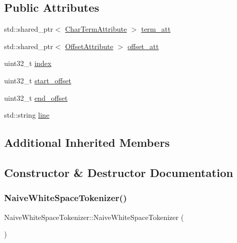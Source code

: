 \subsection*{Public Attributes}
\begin{DoxyCompactItemize}
\item 
std\+::shared\+\_\+ptr$<$ \mbox{\hyperlink{classlucene_1_1core_1_1analysis_1_1tokenattributes_1_1CharTermAttribute}{Char\+Term\+Attribute}} $>$ \mbox{\hyperlink{classNaiveWhiteSpaceTokenizer_ad2b2c7263641059662c19db8a3da72a9}{term\+\_\+att}}
\item 
std\+::shared\+\_\+ptr$<$ \mbox{\hyperlink{classlucene_1_1core_1_1analysis_1_1tokenattributes_1_1OffsetAttribute}{Offset\+Attribute}} $>$ \mbox{\hyperlink{classNaiveWhiteSpaceTokenizer_a45e026472fc925608372e2881d1db2f2}{offset\+\_\+att}}
\item 
uint32\+\_\+t \mbox{\hyperlink{classNaiveWhiteSpaceTokenizer_aa655cc24b8bb85dfedbbb0b42a50db92}{index}}
\item 
uint32\+\_\+t \mbox{\hyperlink{classNaiveWhiteSpaceTokenizer_a94597a26813f5ac60aa3825bf57c20d8}{start\+\_\+offset}}
\item 
uint32\+\_\+t \mbox{\hyperlink{classNaiveWhiteSpaceTokenizer_ae68186bbc8f2a7f32d5c3c2f90014d7f}{end\+\_\+offset}}
\item 
std\+::string \mbox{\hyperlink{classNaiveWhiteSpaceTokenizer_a4d32b68e050394299ec7bfc6eddf7fd5}{line}}
\end{DoxyCompactItemize}
\subsection*{Additional Inherited Members}


\subsection{Constructor \& Destructor Documentation}
\mbox{\label{classNaiveWhiteSpaceTokenizer_a4364bb2206efa47c4ea1cb9eb421d3ec}} 
\subsubsection{\texorpdfstring{Naive\+White\+Space\+Tokenizer()}{NaiveWhiteSpaceTokenizer()}}
{\footnotesize\ttfamily Naive\+White\+Space\+Tokenizer\+::\+Naive\+White\+Space\+Tokenizer (\begin{DoxyParamCaption}{ }\end{DoxyParamCaption})\hspace{0.3cm}{\ttfamily [inline]}}



